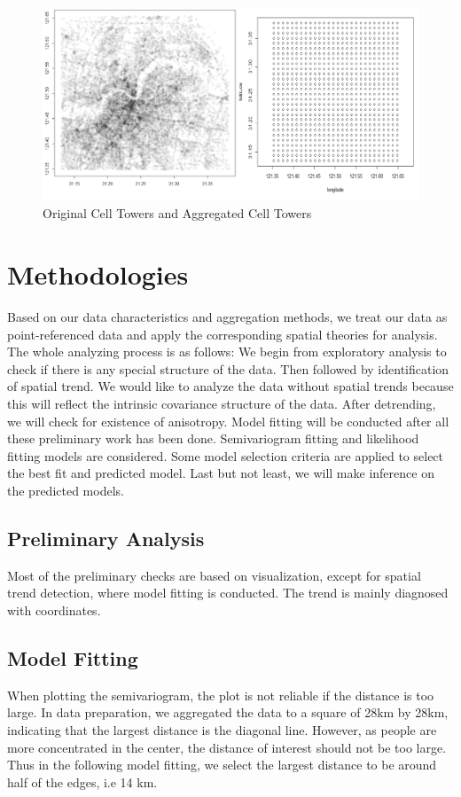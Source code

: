 \documentclass[hidelinks,12pt]{article}
\begin{document}
	\begin{figure}[!ht]
		\includegraphics[width=\textwidth]{tower.png}
		\caption{Original Cell Towers and Aggregated Cell Towers \label{fig:tower}}
	\end{figure}
	
	\section{Methodologies}\label{sec:meth}
	Based on our data characteristics and aggregation methods, we treat our data as point-referenced data and apply the corresponding spatial theories for analysis. The whole analyzing process is as follows: We begin from exploratory analysis to check if there is any special structure of the data. Then followed by identification of spatial trend. We would like to analyze the data without spatial trends because this will reflect the intrinsic covariance structure of the data. After detrending, we will check for existence of anisotropy. Model fitting will be conducted after all these preliminary work has been done. Semivariogram fitting and likelihood fitting models are considered. Some model selection criteria are applied to select the best fit and predicted model. Last but not least, we will make inference on the predicted models.
	
	\subsection{Preliminary Analysis}
	Most of the preliminary checks are based on visualization, except for spatial trend detection, where model fitting is conducted. The trend is mainly diagnosed with coordinates.
	\subsection{Model Fitting}
	When plotting the semivariogram, the plot is not reliable if the distance is too large. In data preparation, we aggregated the data to a square of 28km by 28km, indicating that the largest distance is the diagonal line. However, as people are more concentrated in the center, the distance of interest should not be too large. Thus in the following model fitting, we select the largest distance to be around half of the edges, i.e 14 km.
\end{document}
